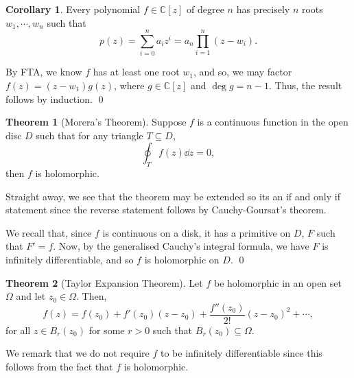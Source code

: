 \documentclass[
]{article}
\theoremstyle{definition}
\newtheorem{theorem}{Theorem}
\newtheorem{corollary}{Corollary}[theorem]
\theoremstyle{definition}
\begin{document}
\begin{corollary}
  Every polynomial \(f \in \mathbb{C}[z]\) of degree \(n\) has precisely 
  \(n\) roots \(w_1, \cdots, w_n\) such that 
  \[p(z) = \sum_{i = 0}^n a_i z^i = a_n\prod_{i = 1}^n (z - w_i).\]
\end{corollary}
\proof

By FTA, we know \(f\) has at least one root \(w_1\), and so, we may
factor \(f(z) = (z - w_1)g(z)\), where \(g \in \mathbb{C}[z]\) and
\(\deg g = n - 1\). Thus, the result follows by induction. \qed

\begin{theorem}[Morera's Theorem]
  Suppose \(f\) is a continuous function in the open disc \(D\) such that for any 
  triangle \(T \subseteq D\), 
  \[\oint_T f(z) \dd z = 0,\]
  then \(f\) is holomorphic.
\end{theorem}

Straight away, we see that the theorem may be extended so its an if and
only if statement since the reverse statement follows by
Cauchy-Goursat's theorem.

\proof

We recall that, since \(f\) is continuous on a disk, it has a primitive
on \(D\), \(F\) such that \(F' = f\). Now, by the generalised Cauchy's
integral formula, we have \(F\) is infinitely differentiable, and so
\(f\) is holomorphic on \(D\). \qed

\begin{theorem}[Taylor Expansion Theorem]
  Let \(f\) be holomorphic in an open set \(\Omega\) and let \(z_0 \in \Omega\). 
  Then, 
  \[f(z) = f(z_0) + f'(z_0)(z - z_0) + \frac{f''(z_0)}{2!}(z - z_0)^2 + \cdots, \]
  for all \(z \in B_r(z_0)\) for some \(r > 0\) such that \(B_r(z_0) \subseteq \Omega\).
\end{theorem}

We remark that we do not require \(f\) to be infinitely differentiable
since this follows from the fact that \(f\) is holomorphic.

\proof
\end{document}
